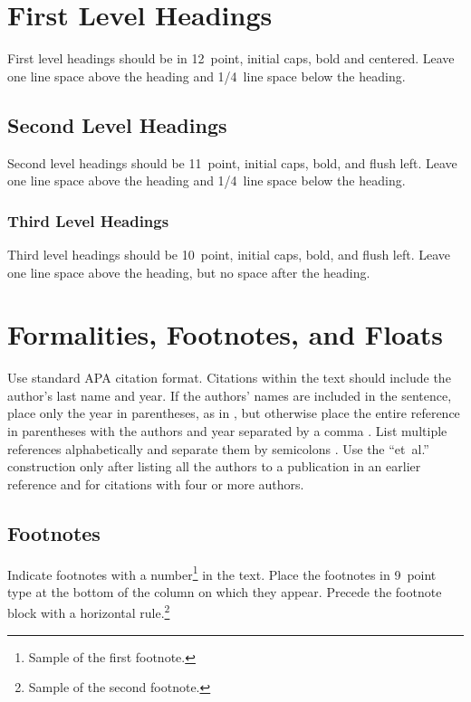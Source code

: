 \documentclass{ccn}  %
\begin{document}
\section{First Level Headings}

First level headings should be in 12~point, initial caps, bold and centered.
Leave one line space above the heading and 1/4~line space below the heading.

\subsection{Second Level Headings}

Second level headings should be 11~point, initial caps, bold, and flush left.
Leave one line space above the heading and 1/4~line space below the heading.

\subsubsection{Third Level Headings}

Third level headings should be 10~point, initial caps, bold, and flush left.
Leave one line space above the heading, but no space after the heading.

\section{Formalities, Footnotes, and Floats}

Use standard APA citation format.
Citations within the text should include the author's last name and year.
If the authors' names are included in the sentence, place only the year in parentheses,
as in \citet{NewellSimon1972a}, but otherwise place the entire reference in parentheses
with the authors and year separated by a comma \citep{NewellSimon1972a}.
List multiple references alphabetically and separate them by semicolons
\citep{ChalnickBillman1988a,NewellSimon1972a}.
Use the ``et~al.'' construction only after listing all the authors to a publication in
an earlier reference and for citations with four or more authors.

\subsection{Footnotes}

Indicate footnotes with a number\footnote{Sample of the first footnote.} in the text.
Place the footnotes in 9~point type at the bottom of the column on which they appear.
Precede the footnote block with a horizontal rule.\footnote{Sample of the second
footnote.}
\end{document}
